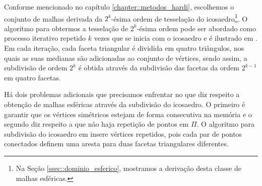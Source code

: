 Conforme mencionado no capítulo \ref{chapter::metodos_hardi}, escolhemos o conjunto de malhas derivada da $2^k$-ésima ordem de tesselação do icosaedro\footnote{Na Seção \ref{ssec::dominio_esferico}, mostramos a derivação desta classe de malhas esféricas.}. O algoritmo para obtermos a tesselação de $2^k$-ésima ordem pode ser abordado como processo iterativo repetido $k$ vezes que se inicia com o icosaedro e é ilustrado em \cite{luna2012}. Em cada iteração, cada faceta triangular é dividida em quatro triângulos, nos quais as suas medianas são adicionadas ao conjunto de vértices, sendo assim, a subdivisão de ordem $2^k$ é obtida através da subdivisão das facetas da ordem $2^{k-1}$ em quatro facetas.


Há dois problemas adicionais que precisamos enfrentar no que diz respeito a obtenção de malhas esféricas através da subdivisão do icosaedro. O primeiro é garantir que os vértices simétricos estejam de forma consecutiva na memória e o segundo diz respeito a que não haja repetição de pontos em $\Pi$. O algoritmo para subdivisão do icosaedro em  insere vértices repetidos, pois cada par de pontos conectados definem uma aresta para duas facetas triangulares diferentes.

